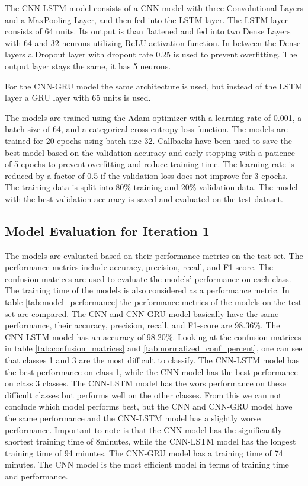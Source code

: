 The CNN-LSTM model consists of a CNN model with three Convolutional Layers and a MaxPooling Layer, and then fed into the LSTM layer. The LSTM layer consists of 64 units. Its output is than flattened and fed into two Dense Layers with 64 and 32 neurons utilizing ReLU activation function. In between the Dense layers a Dropout layer with dropout rate 0.25 is used to prevent overfitting.
The output layer stays the same, it has 5 neurons.

For the CNN-GRU model the same architecture is used, but instead of the LSTM layer a GRU layer with 65 units is used.

The models are trained using the Adam optimizer with a learning rate of 0.001, a batch size of 64, and a categorical cross-entropy loss function. The models are trained for 20 epochs using batch size 32. Callbacks have been used to save the best model based on the validation accuracy and early stopping with a patience of 5 epochs to prevent overfitting and reduce training time. The learning rate is reduced by a factor of 0.5 if the validation loss does not improve for 3 epochs.
The training data is split into 80\% training and 20\% validation data. The model with the best validation accuracy is saved and evaluated on the test dataset.

\subsection{Model Evaluation for Iteration 1}
The models are evaluated based on their performance metrics on the test set. The performance metrics include accuracy, precision, recall, and F1-score. The confusion matrices are used to evaluate the models' performance on each class. The training time of the models is also considered as a performance metric.
In table \ref{tab:model_performance} the performance metrics of the models on the test set are compared. The CNN and CNN-GRU model basically have the same performance, their accuracy, precision, recall, and F1-score are 98.36\%. The CNN-LSTM model has an accuracy of 98.20\%. Looking at the confusion matrices in table \ref{tab:confusion_matrices} and \ref{tab:normalized_conf_percent}, one can see that classes 1 and 3 are the most difficult to classify. The CNN-LSTM model has the best performance on class 1, while the CNN model has the best performance on class 3 classes. The CNN-LSTM model has the wors performance on these difficult classes but performs well on the other classes. From this we can not conclude which model performs best, but the CNN and CNN-GRU model have the same performance and the CNN-LSTM model has a slightly worse performance. Important to note is that the CNN model has the significantly shortest training time of 8minutes, while the CNN-LSTM model has the longest training time of 94 minutes. The CNN-GRU model has a training time of 74 minutes. The CNN model is the most efficient model in terms of training time and performance.

